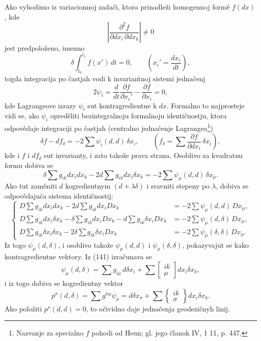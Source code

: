 \documentclass[11pt]{article}
\begin{document}
Ako vyhodimo iz variacionnoj zadači, ktora prinadleži homogennoj formě $f(dx)$, kde
\[
\left|\frac{\partial^2 f}{\partial dx_i\,\partial dx_k}\right|\ne0
\]
jest predpoloženo, imenno
\begin{equation}
 \delta\int_{t_0}^{t_1} f(x')\,dt=0,
 \qquad \left(x_i'=\frac{dx_i}{dt}\right),
\tag{140}
\end{equation}
togda integracija po častjah vodi k invariantnoj sistemi jednačenj
\[
 2\psi_i=\frac{d}{dt}\frac{\partial f}{\partial x_i'}-\frac{\partial f}{\partial x_i}=0,
\]
kde Lagrangeove izrazy $\psi_i$ sut kontragredientne k $dx$. Formalno to najprosteje vidi se, ako $\psi_i$ opreděliti bezintegralnoju formalnoju identičnostju, ktora odpovědaje integraciji po častjah (centralno jednačenje Lagrangea\footnote{Nazvanje za specialno $f$ pohodi od Heun; gl. jego članok IV, 1 11, p. 447.})
\[
 \delta f-df_\delta=-2\sum\psi_i(d,d)\,\delta x_i,
 \qquad
 \left(f_\delta=\sum\frac{\partial f}{\partial dx_i}\,\delta x_i\right),
\]
kde i $f$ i $df_\delta$ sut invarianty, i zato takože prava strana. Osoblivo za kvadratnu formu dobiva se
\[
 \delta\sum g_{ik}dx_i dx_k-2d\sum g_{ik}dx_i\delta x_k
 =-2\sum\psi_\mu(d,d)\,\delta x_\mu.
\]
Ako tut zaměniti $d$ kogredientnym $(d+\lambda\delta)$ i sravniti stepeny po $\lambda$, dobiva se odpovědajuča sistema identičnostij:
\begin{equation}
\left\{
\begin{aligned}
D\sum g_{ik}dx_i dx_k-2d\sum g_{ik}dx_iDx_k
   &=-2\sum\psi_\mu(d,d)\,Dx_\mu,\\
D\sum g_{ik}dx_i\delta x_k-\delta\sum g_{ik}dx_iDx_k
   -d\sum g_{ik}\delta x_iDx_k
   &=-2\sum\psi_\mu(d,\delta)\,Dx_\mu,\\
D\sum g_{ik}\delta x_i\delta x_k-2\delta\sum g_{ik}\delta x_iDx_k
   &=-2\sum\psi_\mu(\delta,\delta)\,Dx_\mu.
\end{aligned}
\right.
\tag{141}
\end{equation}
Iz togo $\psi_\mu(d,\delta)$, i osoblivo takože $\psi_\mu(d,d)$ i $\psi_\mu(\delta,\delta)$, pokazyvajut se kako kontragredientne vektory. Iz (141) izračunava se
\[
 \psi_\mu(d,\delta)=\sum g_{i\mu}\,d\delta x_i+
 \sum\left[\begin{smallmatrix}ik\\ \mu\end{smallmatrix}\right]dx_i\delta x_k,
\]
i iz togo dobiva se kogredientny vektor
\begin{equation}
 p^\sigma(d,\delta)=\sum g^{\sigma\mu}\psi_\mu
 =d\delta x_\sigma+
 \sum\left\{\begin{smallmatrix}ik\\ \sigma\end{smallmatrix}\right\}dx_i\delta x_k.
\tag{142}
\end{equation}
Ako položiti $p^\nu(d,d)=0$, to očividno daje jednačenja geodezičnyh linij.
\end{document}
